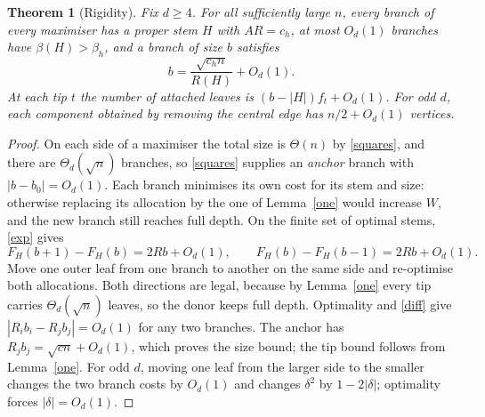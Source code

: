 \documentclass[11pt,a4paper]{article}
\newtheorem{theorem}{Theorem}[section]
\theoremstyle{remark}
\begin{document}
\begin{theorem}[Rigidity]\label{rigid}
Fix $d\ge4$. For all sufficiently large $n$, every branch of every maximiser has a proper stem $H$ with $AR=c_h$, at most $O_d(1)$ branches have $\beta(H)>\beta_h$, and a branch of size $b$ satisfies
\[
 b=\frac{\sqrt{c_h n}}{R(H)}+O_d(1).
\]
At each tip $t$ the number of attached leaves is $(b-|H|)f_t+O_d(1)$. For odd $d$, each component obtained by removing the central edge has $n/2+O_d(1)$ vertices.
\end{theorem}
\begin{proof}
On each side of a maximiser the total size is $\Theta(n)$ by \eqref{squares}, and there are $\Theta_d(\sqrt n)$ branches, so \eqref{squares} supplies an \emph{anchor} branch with $|b-b_0|=O_d(1)$. Each branch minimises its own cost for its stem and size: otherwise replacing its allocation by the one of Lemma~\ref{one} would increase $W$, and the new branch still reaches full depth. On the finite set of optimal stems, \eqref{exp} gives
\begin{equation}
 F_H(b+1)-F_H(b)=2Rb+O_d(1),\qquad
 F_H(b)-F_H(b-1)=2Rb+O_d(1). \label{diff}
\end{equation}
Move one outer leaf from one branch to another on the same side and re-optimise both allocations. Both directions are legal, because by Lemma~\ref{one} every tip carries $\Theta_d(\sqrt n)$ leaves, so the donor keeps full depth. Optimality and \eqref{diff} give $|R_ib_i-R_jb_j|=O_d(1)$ for any two branches. The anchor has $R_jb_j=\sqrt{cn}+O_d(1)$, which proves the size bound; the tip bound follows from Lemma~\ref{one}. For odd $d$, moving one leaf from the larger side to the smaller changes the two branch costs by $O_d(1)$ and changes $\delta^2$ by $1-2|\delta|$; optimality forces $|\delta|=O_d(1)$.
\end{proof}
\end{document}
